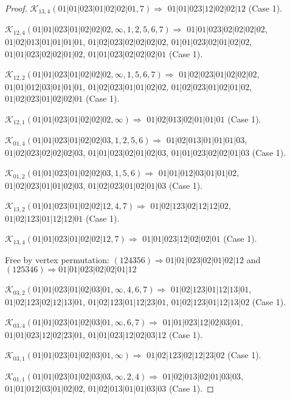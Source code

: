 \documentclass[12pt]{article}
\theoremstyle{plain}
\theoremstyle{definition}
\theoremstyle{remark}
\newcommand{\fancy}[1]{\mathcal{#1}}
\def\K{\fancy{K}}
\begin{document}
\begin{proof}
	$\K_{13,4}(01|01|023|01|02|02|01,7)\Rightarrow $ $01|01|023|12|02|02|12$ (Case 1).
	
	
	\bigskip
	
	$\K_{12,4}(01|01|023|01|02|02|02,\infty,1, 2, 5, 6, 7)\Rightarrow $ $01|01|023|02|02|02|02$, $01|02|013|01|01|01|01$, $01|02|023|02|02|02|02$, $01|01|023|02|01|02|02$, $01|01|023|02|02|01|02$, $01|01|023|02|02|02|01$ (Case 1).
	
	$\K_{12,2}(01|01|023|01|02|02|02,\infty,1, 5, 6, 7)\Rightarrow $ $01|02|023|01|02|02|02$, $01|01|012|03|01|01|01$, $01|02|023|01|01|02|02$, $01|02|023|01|02|01|02$, $01|02|023|01|02|02|01$ (Case 1).
	
	$\K_{12,1}(01|01|023|01|02|02|02,\infty)\Rightarrow $ $01|02|013|02|01|01|01$ (Case 1).
	
	
	\bigskip
	
	$\K_{01,4}(01|01|023|01|02|02|03,1, 2, 5, 6)\Rightarrow $ $01|02|013|01|01|01|03$, $01|02|023|02|02|02|03$, $01|01|023|02|01|02|03$, $01|01|023|02|02|01|03$ (Case 1).
	
	$\K_{01,2}(01|01|023|01|02|02|03,1, 5, 6)\Rightarrow $ $01|01|012|03|01|01|02$, $01|02|023|01|01|02|03$, $01|02|023|01|02|01|03$ (Case 1).
	
	
	\bigskip
	
	$\K_{13,2}(01|01|023|01|02|02|12,4, 7)\Rightarrow $ $01|02|123|02|12|12|02$, $01|02|123|01|12|12|01$ (Case 1).
	
	$\K_{13,4}(01|01|023|01|02|02|12,7)\Rightarrow $ $01|01|023|12|02|02|01$ (Case 1).
	
	
	
	Free by vertex permutation: $(1 2 4 3 5 6)\Rightarrow 01|01|023|02|01|02|12$ and $(1 2 5 3 4 6)\Rightarrow 01|01|023|02|02|01|12$
	
	
	
	\bigskip
	
	$\K_{03,2}(01|01|023|01|02|03|01,\infty,4, 6, 7)\Rightarrow $ $01|02|123|01|12|13|01$, $01|02|123|02|12|13|01$, $01|02|123|01|12|23|01$, $01|02|123|01|12|13|02$ (Case 1).
	
	$\K_{03,4}(01|01|023|01|02|03|01,\infty,6, 7)\Rightarrow $ $01|01|023|12|02|03|01$, $01|01|023|12|02|23|01$, $01|01|023|12|02|03|12$ (Case 1).
	
	$\K_{03,1}(01|01|023|01|02|03|01,\infty)\Rightarrow $ $01|02|123|02|12|23|02$ (Case 1).
	
	
	\bigskip
	
	$\K_{01,1}(01|01|023|01|02|03|03,\infty,2, 4)\Rightarrow $ $01|02|013|02|01|03|03$, $01|01|012|03|01|02|02$, $01|02|013|01|01|03|03$ (Case 1).
	

\end{proof}
\end{document}
